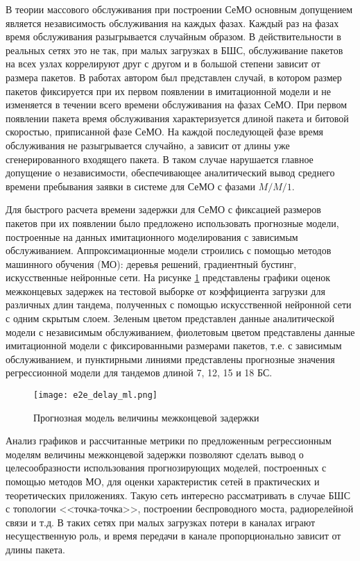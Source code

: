 В теории массового обслуживания при построении СеМО основным допущением является независимость обслуживания на каждых фазах. Каждый раз на фазах время обслуживания разыгрывается случайным образом. В действительности в реальных сетях это не так, при малых загрузках в БШС, обслуживание пакетов на всех узлах коррелируют друг с другом и в большой степени зависит от размера пакетов. В работах \cite{LazarevaLarionovMukhtarovITTMM2020_RSCI,VishnevskyLarionovMukhtarovICAM2020_RSCI} автором был представлен случай, в котором размер пакетов фиксируется при их первом появлении в имитационной модели и не изменяется в течении всего времени обслуживания на фазах СеМО. При первом появлении пакета время обслуживания характеризуется длиной пакета и битовой скоростью, приписанной фазе СеМО.  На каждой последующей фазе время обслуживания не разыгрывается случайно, а зависит от длины уже сгенерированного входящего пакета. В таком случае нарушается главное допущение о независимости, обеспечивающее аналитический вывод среднего времени пребывания заявки в системе для СеМО с фазами $M/M/1$. 

Для быстрого расчета времени задержки для СеМО с фиксацией размеров пакетов при их появлении было предложено использовать прогнозные модели, построенные на данных имитационного моделирования с зависимым обслуживанием. Аппроксимационные модели строились с помощью методов машинного обучения (МО): деревья решений, градиентный бустинг, искусственные нейронные сети. На рисунке \cref{fig:part1_e2e_delay_ml} представлены графики оценок межконцевых задержек на тестовой выборке от коэффициента загрузки для различных длин тандема, полученных с помощью искусственной нейронной сети с одним скрытым слоем. Зеленым цветом представлен данные аналитической модели с независимым обслуживанием, фиолетовым цветом представлены данные имитационной модели с фиксированными размерами пакетов, т.е. с зависимым обслуживанием, и пунктирными линиями представлены прогнозные значения регрессионной модели для тандемов длиной 7, 12, 15 и 18 БС.

\begin{figure}[h!]
  \centering
   \texttt{[image: e2e\_delay\_ml.png]}
\caption{Прогнозная модель величины межконцевой задержки}
\label{fig:part1_e2e_delay_ml}
\end{figure}

Анализ графиков и рассчитанные метрики по предложенным регрессионным моделям величины межконцевой задержки позволяют сделать вывод о целесообразности использования прогнозирующих моделей, построенных с помощью методов МО, для оценки характеристик сетей в практических и теоретических приложениях. Такую сеть интересно рассматривать в случае БШС с топологии <<точка-точка>>, построении беспроводного моста, радиорелейной связи и т.д. В таких сетях при малых загрузках потери в каналах играют несущественную роль, и время передачи в канале пропорционально зависит от длины пакета. 

